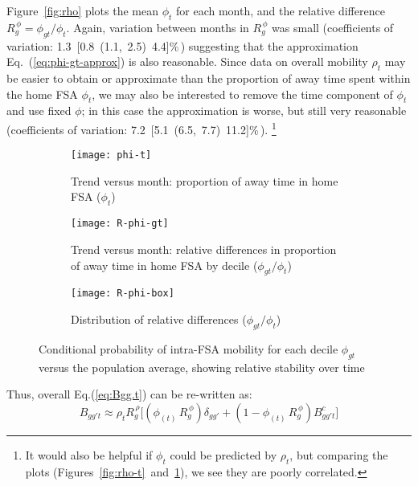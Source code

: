 Figure~\ref{fig:rho} plots the mean $\phi_{t}$ for each month,
and the relative difference $R^{\,\phi}_{g} = \phi_{gt} / \phi_{t}$.
Again, variation between months in $R^{\,\phi}_{g}$ was small
(coefficients of variation: 1.3~[0.8~(1.1,~2.5)~4.4]\%\,)
suggesting that the approximation Eq.~(\ref{eq:phi-gt-approx}) is also reasonable.
Since data on overall mobility $\rho_{t}$ may be easier to obtain or approximate than
the proportion of away time spent within the home FSA $\phi_{t}$,
we may also be interested to remove the time component of $\phi_{t}$ and use fixed $\phi$;
in this case the approximation is worse, but still very reasonable
(coefficients of variation: 7.2~[5.1~(6.5,~7.7)~11.2]\%\,).%
\footnote{It would also be helpful if $\phi_{t}$ could be predicted by $\rho_{t}$,
  but comparing the plots (Figures~\ref{fig:rho-t}~and~\ref{fig:phi-t}),
  we see they are poorly correlated.}
\begin{figure}
  \begin{subfigure}[t]{0.297\linewidth}
    \texttt{[image: phi-t]}
    \caption{Trend versus month: proportion of away time in home FSA ($\phi_{t}$)}
    \label{fig:phi-t}
  \end{subfigure}\hfill
  \begin{subfigure}[t]{0.33\linewidth}
    \texttt{[image: R-phi-gt]}
    \caption{Trend versus month: relative differences in
      proportion of away time in home FSA by decile ($\phi_{gt} / \phi_{t}$)}
    \label{fig:phi-gt}
  \end{subfigure}\hfill
  \begin{subfigure}[t]{0.33\linewidth}
    \texttt{[image: R-phi-box]}
    \caption{Distribution of relative differences ($\phi_{gt} / \phi_{t}$)}
    \label{fig:phi-box}
  \end{subfigure}
  \caption{Conditional probability of intra-FSA mobility for each decile $\phi_{gt}$
    versus the population average,
    showing relative stability over time}
  \label{fig:phi}
\end{figure}
\par
Thus, overall Eq.(\ref{eq:Bgg.t}) can be re-written as:
\begin{equation}\label{eq:Bgg.t.approx}
  B_{gg't} \approx \rho_{t} R^{\,\rho}_{g} \Big[
    (\phi_{(t)}\,R^{\,\phi}_{g}) \delta_{gg'} + (1-\phi_{(t)}\,R^{\,\phi}_{g}) B^c_{gg't}
  \Big]
\end{equation}
